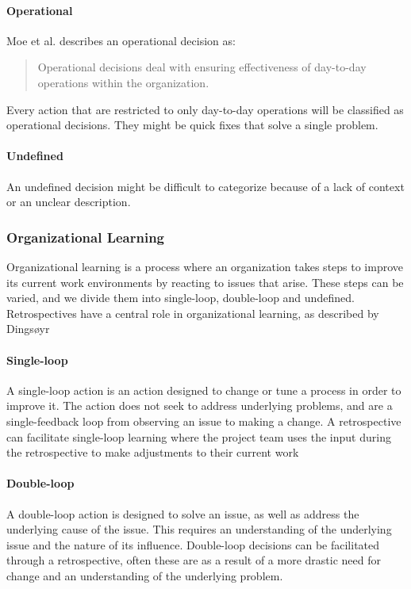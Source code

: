 \paragraph{Operational}
Moe et al. describes an operational decision as: 
\begin{quote}
Operational decisions deal with ensuring effectiveness of day-to-day operations within the organization. 
\end{quote}
Every action that are restricted to only day-to-day operations will be classified as operational decisions. They might be quick fixes that solve a single problem. 
\paragraph{Undefined}
An undefined decision might be difficult to categorize because of a lack of context or an unclear description.

\subsubsection{Organizational Learning}
Organizational learning is a process where an organization takes steps to improve its current work environments by reacting to issues that arise. These steps can be varied, and we divide them into single-loop, double-loop and undefined. Retrospectives have a central role in 	organizational learning, as described by Dingsøyr ~\cite{Dingsoyr2007}
\paragraph{Single-loop}
A single-loop action is an action designed to change or tune a process in order to improve it. The action does not seek to address underlying problems, and are a single-feedback loop from observing an issue to making a change. A retrospective can facilitate single-loop learning where the project team uses the input during the retrospective to make adjustments to their current work ~\cite{Dingsoyr2004}
\paragraph{Double-loop}
A double-loop action is designed to solve an issue, as well as address the underlying cause of the issue. This requires an understanding of the underlying issue and the nature of its influence. Double-loop decisions can be facilitated through a retrospective, often these are as a result of a more drastic need for change and an understanding of the underlying problem. ~\cite{Dingsoyr2004}

